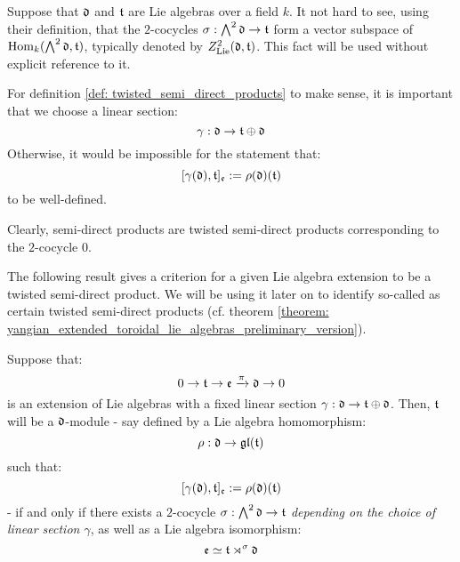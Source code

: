         \begin{remark}
            Suppose that $\mathfrak{d}$ and $\mathfrak{t}$ are Lie algebras over a field $k$. It not hard to see, using their definition, that the $2$-cocycles $\sigma: \bigwedge^2 \mathfrak{d} \to \mathfrak{t}$ form a vector subspace of $\mathrm{Hom}_k(\bigwedge^2 \mathfrak{d}, \mathfrak{t})$, typically denoted by $Z^2_{\mathrm{Lie}}(\mathfrak{d}, \mathfrak{t})$. This fact will be used without explicit reference to it.
        \end{remark}
        \begin{remark}
            For definition \ref{def: twisted_semi_direct_products} to make sense, it is important that we choose a linear section:
                $$\gamma: \mathfrak{d} \to \mathfrak{t} \oplus \mathfrak{d}$$
            Otherwise, it would be impossible for the statement that:
                $$[\gamma(\mathfrak{d}), \mathfrak{t}]_{\mathfrak{e}} := \rho(\mathfrak{d})(\mathfrak{t})$$
            to be well-defined.
        \end{remark}
        \begin{example}
            Clearly, semi-direct products are twisted semi-direct products corresponding to the $2$-cocycle $0$.
        \end{example}
        The following result gives a criterion for a given Lie algebra extension to be a twisted semi-direct product. We will be using it later on to identify so-called  as certain twisted semi-direct products (cf. theorem \ref{theorem: yangian_extended_toroidal_lie_algebras_preliminary_version}).
        \begin{proposition} \label{prop: twisted_semi_direct_product_criterion}
            Suppose that:
                $$0 \to \mathfrak{t} \to \mathfrak{e} \xrightarrow[]{\pi} \mathfrak{d} \to 0$$
            is an extension of Lie algebras with a fixed linear section $\gamma: \mathfrak{d} \to \mathfrak{t} \oplus \mathfrak{d}$. Then, $\mathfrak{t}$ will be a $\mathfrak{d}$-module - say defined by a Lie algebra homomorphism:
                $$\rho: \mathfrak{d} \to \mathfrak{gl}(\mathfrak{t})$$
            such that:
                $$[\gamma(\mathfrak{d}), \mathfrak{t}]_{\mathfrak{e}} := \rho(\mathfrak{d})(\mathfrak{t})$$
            - if and only if there exists a $2$-cocycle $\sigma: \bigwedge^2 \mathfrak{d} \to \mathfrak{t}$ \textit{depending on the choice of linear section $\gamma$}, as well as a Lie algebra isomorphism:
                $$\mathfrak{e} \simeq \mathfrak{t} \rtimes^{\sigma} \mathfrak{d}$$
        \end{proposition}
